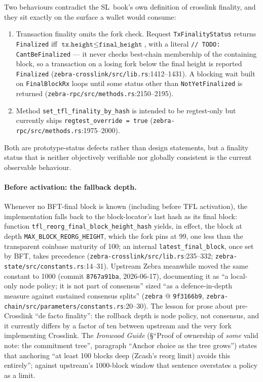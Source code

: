 \documentclass[11pt,a4paper]{article}
\theoremstyle{definition}
\begin{document}
Two behaviours contradict the SL~book's own definition of crosslink
finality, and they sit exactly on the surface a wallet would consume:
\begin{enumerate}[label=(\roman*)]
\item Transaction finality omits the fork check. Request
  \texttt{TxFinalityStatus} returns \texttt{Finalized} iff
  $\texttt{tx.height} \le \texttt{final\_height}$, with a literal
  \texttt{// TODO: CantBeFinalized} --- it never checks best-chain
  membership of the containing block, so a transaction on a losing fork
  below the final height is reported \texttt{Finalized}
  (\texttt{zebra-crosslink/src/lib.rs}:1412--1431). A blocking wait built
  on \texttt{FinalBlockRx} loops until some status other than
  \texttt{NotYetFinalized} is returned
  (\texttt{zebra-rpc/src/methods.rs}:2150--2195).
\item Method \texttt{set\_tfl\_finality\_by\_hash} is intended to be
  regtest-only but currently ships \texttt{regtest\_override = true}
  (\texttt{zebra-rpc/src/methods.rs}:1975--2000).
\end{enumerate}
Both are prototype-status defects rather than design statements, but a
finality status that is neither objectively verifiable nor globally
consistent is the current observable behaviour.

\paragraph{Before activation: the fallback depth.} Whenever no BFT-final
block is known (including before TFL activation), the implementation
falls back to the block-locator's last hash as its final block: function
\texttt{tfl\_reorg\_final\_block\_height\_hash} yields, in effect, the
block at depth \texttt{MAX\_BLOCK\_REORG\_HEIGHT}, which the fork pins
at 99, one less than the transparent coinbase maturity of 100; an
internal \texttt{latest\_final\_block}, once set by BFT, takes
precedence (\texttt{zebra-crosslink/src/lib.rs}:235--332;
\texttt{zebra-state/src/constants.rs}:14--31). Upstream Zebra meanwhile
moved the same constant to 1000 (commit \texttt{8767a91ba}, 2026-06-17),
documenting it as ``a local-only node policy; it is not part of
consensus'' sized ``as a defence-in-depth measure against sustained
consensus splits'' (\texttt{zebra} @ \texttt{9f3166b9},
\texttt{zebra-chain/src/parameters/constants.rs}:20--30).
The lesson for prose about pre-Crosslink ``de facto finality'': the
rollback depth is node policy, not consensus, and it currently differs by
a factor of ten between upstream and the very fork implementing
Crosslink. The \emph{Ironwood Guide} (\S``Proof of ownership of \emph{some}
valid note: the commitment tree'', paragraph ``Anchor choice as the tree
grows'') states that anchoring ``at least 100 blocks deep (Zcash's reorg
limit) avoids this entirely''; against upstream's 1000-block window that
sentence overstates a policy as a limit.
\end{document}
